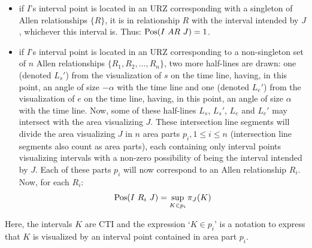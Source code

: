 \begin{itemize}
	\item if $I$'s interval point is located in an URZ corresponding with a singleton of Allen relationships $\{R\}$, it is in relationship $R$ with the interval intended by $J$, whichever this interval is. Thus: $\Pos(I\ AR\ J) = 1$.
	\item if $I$'s interval point is located in an URZ corresponding to a non-singleton set of $n$ Allen relationships $\{R_1, R_2, \ldots, R_n\}$, two more half-lines are drawn: one (denoted $L_s'$) from the visualization of $s$ on the time line, having, in this point, an angle of size $-\alpha$ with the time line and one (denoted $L_e'$) from the visualization of $e$ on the time line, having, in this point, an angle of size $\alpha$ with the time line. Now, some of these half-lines $L_s$, $L_s'$, $L_e$ and $L_e'$ may intersect with the area visualizing $J$. These intersection line segments will divide the area visualizing $J$ in $n$ area parts $p_i, 1 \leq i \leq n$ (intersection line segments also count as area parts), each containing only interval points visualizing intervals with a non-zero possibility of being the interval intended by $J$. Each of these parts $p_i$ will now correspond to an Allen relationship $R_i$. Now, for each $R_i$:
	\begin{equation}
		\operatorname{Pos}(I\ R_i\ J) = \sup_{K \in p_i} \pi_J(K)
	\end{equation}
\end{itemize}

Here, the intervals $K$ are CTI and the expression `$K \in p_i$' is a notation to express that $K$ is visualized by an interval point contained in area part $p_i$.
